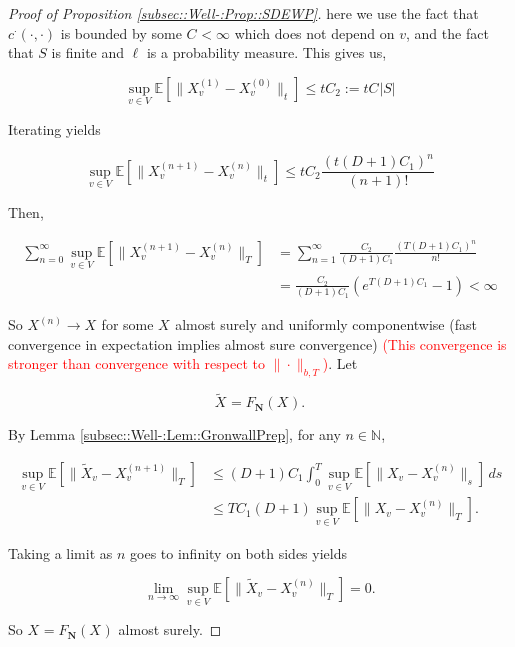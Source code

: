 \documentclass[12pt]{article}
\newcommand{\mb}{\mathbb}
\newcommand{\ra}{\rightarrow}
\newcommand{\tr}{\textcolor{red}}
\newcommand{\ex}[1]{\mb{E}\left[#1\right]}			%
\newcommand{\defeq}{:=}								%
\renewcommand{\v}{v}							%
\renewcommand{\S}{S}							%
\renewcommand{\b}{b}							%
\newcommand{\T}{T}								%
\renewcommand{\t}{t}							%
\renewcommand{\tt}{s}							%
\newcommand{\X}{X}								%
\newcommand{\IGr}{c}							%
\newcommand{\vind}[1]{^{#1}}					%
\newcommand{\cind}[1]{_{#1}}					%
\newcommand{\tip}[1]{#1}						%
\newcommand{\const}{C}							%
\newcommand{\degr}{D}							%
\newcommand{\sln}[1]{^{(#1)}}					%
\newcommand{\poisses}{\mathbf{N}}				%
\newcommand{\Sm}{\ell}							%
\newcommand{\Fpo}{F_{\poisses}}					%
\newcommand{\alt}[1]{\widetilde{#1}}			%
\newcommand{\indx}[1]{_{#1}}					%
\begin{document}
\begin{proof}[Proof of Proposition \ref{subsec::Well-:Prop::SDEWP}]
here we use the fact that \(\IGr\vind{\cdot}(\cdot,\cdot)\) is bounded by some \(\const\indx{} < \infty\) which does not depend on \(\v\), and the fact that \(\S\) is finite and \(\Sm\) is a probability measure. This gives us,

\[\sup_{\v \in V}\ex{\|\X\sln{1}\cind{\v}\tip{} - \X\sln{0}\cind{\v}\tip{}\|_\t} \leq \t\const\indx{2} \defeq \t\const\indx{}|\S|\]

Iterating yields

\[\sup_{\v \in V} \ex{\|\X\sln{n+1}\cind{\v}\tip{} - \X\sln{n}\cind{\v}\tip{}\|_\t} \leq \t\const\indx{2}\frac{(\t(\degr+1)\const\indx{1})^n}{(n+1)!}\]

Then,

\begin{align*}
\sum_{n=0}^\infty \sup_{\v \in V} \ex{\|\X\sln{n+1}\cind{\v}\tip{} - \X\sln{n}\cind{\v}\tip{}\|_\T} &= \sum_{n=1}^\infty \frac{\const\indx{2}}{(\degr+1)\const\indx{1}}\frac{(\T(\degr+1)\const\indx{1})^{n}}{n !}\\
& = \frac{\const\indx{2}}{(\degr+1)\const\indx{1}}(e^{\T(\degr+1)\const\indx{1}} - 1) < \infty
\end{align*}


So \(\X\sln{n}\cind{}\tip{} \ra \X\cind{}\tip{}\) for some \(\X\cind{}\tip{}\) almost surely and uniformly componentwise (fast convergence in expectation implies almost sure convergence) \tr{(This convergence is stronger than convergence with respect to \(\|\cdot\|_{\b,\T}\))}. Let 

\[\alt{\X}\cind{}\tip{} = \Fpo(\X\cind{}\tip{}).\]

By Lemma \ref{subsec::Well-:Lem::GronwallPrep}, for any \(n\in\mb{N}\),

\begin{align*}
\sup_{\v \in V} \ex{\|\alt{\X}\cind{\v}\tip{} - \X\sln{n+1}\cind{\v}\tip{}\|_\T} &\leq (\degr+1)\const\indx{1}\int_0^\T \sup_{\v \in V}\ex{\|\X\cind{\v}\tip{} - \X\sln{n}\cind{\v}\tip{}\|_\tt}\,d\tt \\
&\leq \T\const\indx{1}(\degr+1)\sup_{\v\in V} \ex{\|\X\cind{\v}\tip{} - \X\sln{n}\cind{\v}\tip{}\|_\T}.
\end{align*}

Taking a limit as \(n\) goes to infinity on both sides yields

\[\lim_{n\ra\infty} \sup_{\v \in V} \ex{\|\alt{\X}\cind{\v}\tip{} - \X\sln{n}\cind{\v}\tip{}\|_\T} = 0.\]

So \(\X\cind{}\tip{}= \Fpo(\X\cind{}\tip{})\) almost surely.
\end{proof}
\end{document}
